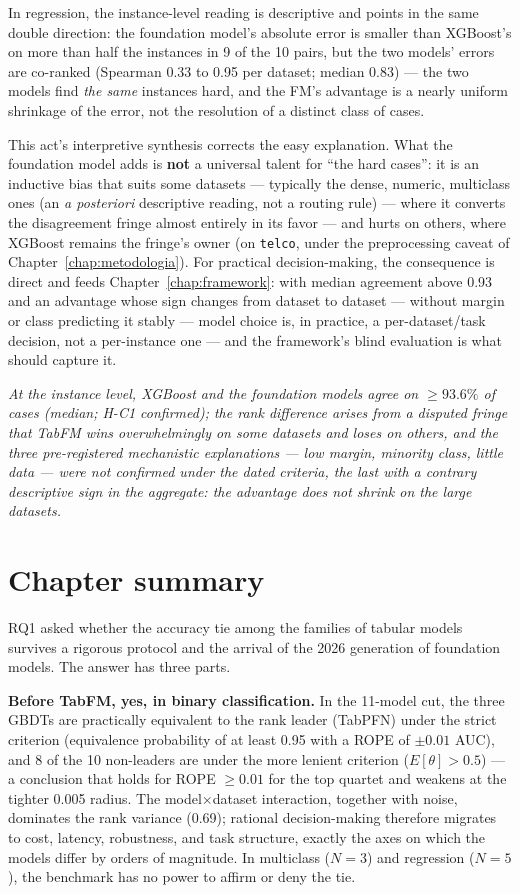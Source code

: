 In regression, the instance-level reading is descriptive and points
in the same double direction: the foundation model's absolute error
is smaller than XGBoost's on more than half the instances in 9 of
the 10 pairs, but the two models' errors are co-ranked (Spearman
0.33 to 0.95 per dataset; median 0.83) --- the two models find
\emph{the same} instances hard, and the FM's advantage is a nearly
uniform shrinkage of the error, not the resolution of a distinct
class of cases.

This act's interpretive synthesis corrects the easy explanation.
What the foundation model adds is \textbf{not} a universal talent
for ``the hard cases'': it is an inductive bias that suits some
datasets --- typically the dense, numeric, multiclass ones (an
\emph{a posteriori} descriptive reading, not a routing rule) ---
where it converts the disagreement fringe almost entirely in its
favor --- and hurts on others, where XGBoost remains the fringe's
owner (on \texttt{telco}, under the preprocessing caveat of
Chapter~\ref{chap:metodologia}). For practical decision-making, the consequence is direct and
feeds Chapter~\ref{chap:framework}: with median agreement above
0.93 and an advantage whose sign changes from dataset to dataset ---
without margin or class predicting it stably --- model choice is, in
practice, a per-dataset/task decision, not a per-instance one ---
and the framework's blind evaluation is what should capture it.

\emph{At the instance level, XGBoost and the foundation models agree
on ${\ge}93.6\%$ of cases (median; H-C1 confirmed); the rank
difference arises from a disputed fringe that TabFM wins
overwhelmingly on some datasets and loses on others, and the three
pre-registered mechanistic explanations --- low margin, minority
class, little data --- were not confirmed under the dated criteria,
the last with a contrary descriptive sign in the aggregate: the
advantage does not shrink on the large datasets.}

\section{Chapter summary}
\label{sec:cap5-sintese}

RQ1 asked whether the accuracy tie among the families of tabular
models survives a rigorous protocol and the arrival of the 2026
generation of foundation models. The answer has three parts.

\textbf{Before TabFM, yes, in binary classification.} In the
11-model cut, the three GBDTs are practically equivalent to the rank
leader (TabPFN) under the strict criterion (equivalence probability
of at least 0.95 with a ROPE of $\pm0.01$ AUC), and 8 of the 10
non-leaders are under the more lenient criterion ($E[\theta]>0.5$)
--- a conclusion that holds for ROPE $\geq 0.01$ for the top
quartet and weakens at the tighter 0.005 radius.
The model$\times$dataset interaction, together with noise, dominates
the rank variance (0.69); rational decision-making therefore
migrates to cost, latency, robustness, and task structure, exactly
the axes on which the models differ by orders of magnitude. In
multiclass ($N{=}3$) and regression ($N{=}5$), the benchmark has no
power to affirm or deny the tie.

